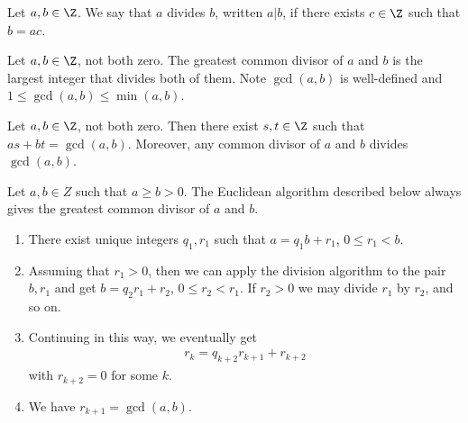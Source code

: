 \documentclass{article}
\begin{document}
\begin{definition}
    Let $a,b\in\Z$. We say that $a$ divides $b$, written $a|b$, if there exists $c\in\Z$
    such that $b=ac$.
\end{definition}

\begin{definition}
    Let $a,b\in\Z$, not both zero. The greatest common divisor of $a$ and $b$ is the largest integer 
    that divides both of them. Note $\gcd(a,b)$ is well-defined and $1\leq\gcd(a,b)\leq\min(a,b)$.
\end{definition}

\begin{lemma}[Bezout]
    Let $a,b\in\Z$, not both zero. Then there exist $s,t\in\Z$ such that 
    $as + bt = \gcd(a,b)$. Moreover, any common divisor of $a$ and $b$ divides $\gcd(a,b)$.  
\end{lemma}

\begin{theorem}
    Let $a,b\in Z$ such that $a\geq b>0$.
    The Euclidean algorithm described below always gives the greatest common divisor of 
    $a$ and $b$.
    \begin{enumerate}
        \item There exist unique integers $q_1,r_1$ such that $a=q_1b+r_1$, $0\leq r_1<b$.
        \item Assuming that $r_1>0$, then we can apply the division algorithm to the pair
            $b,r_1$ and get $b=q_2r_1 + r_2$, $0\leq r_2<r_1$. If $r_2>0$ we may divide 
            $r_1$ by $r_2$, and so on.
        \item Continuing in this way, we eventually get \begin{align*}
            r_k=q_{k+2}r_{k+1}+r_{k+2}
        \end{align*}
        with $r_{k+2}=0$ for some $k$.
        \item We have $r_{k+1}=\gcd(a,b)$.
    \end{enumerate}
\end{theorem}
\end{document}
